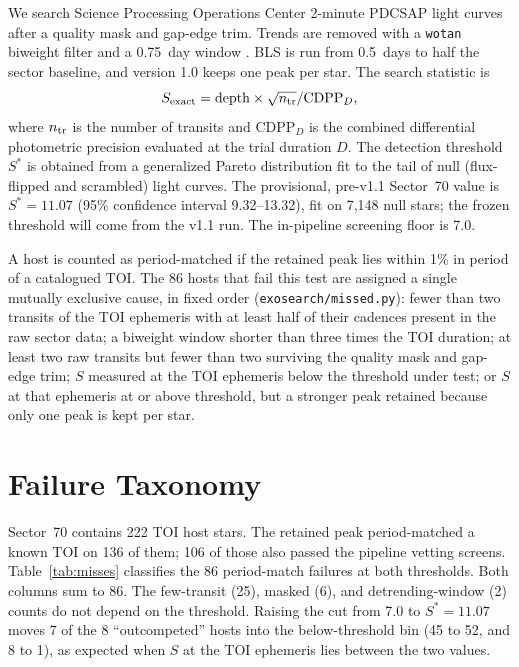 \documentclass[RNAAS]{aastex631}
\begin{document}
We search Science Processing Operations Center 2-minute PDCSAP light curves after a quality mask and gap-edge trim. Trends are removed with a \texttt{wotan} biweight filter and a 0.75~day window \citep{hippke19}. BLS is run from 0.5~days to half the sector baseline, and version 1.0 keeps one peak per star. The search statistic is
\begin{equation}
S_{\rm exact}=\mathrm{depth}\times\sqrt{n_{\rm tr}}/\mathrm{CDPP}_{D},
\end{equation}
where $n_{\rm tr}$ is the number of transits and $\mathrm{CDPP}_{D}$ is the combined differential photometric precision evaluated at the trial duration $D$. The detection threshold $S^{*}$ is obtained from a generalized Pareto distribution fit to the tail of null (flux-flipped and scrambled) light curves. The provisional, pre-v1.1 Sector~70 value is $S^{*}=11.07$ (95\% confidence interval 9.32--13.32), fit on 7,148 null stars; the frozen threshold will come from the v1.1 run. The in-pipeline screening floor is 7.0.

A host is counted as period-matched if the retained peak lies within 1\% in period of a catalogued TOI. The 86 hosts that fail this test are assigned a single mutually exclusive cause, in fixed order (\texttt{exosearch/missed.py}): fewer than two transits of the TOI ephemeris with at least half of their cadences present in the raw sector data; a biweight window shorter than three times the TOI duration; at least two raw transits but fewer than two surviving the quality mask and gap-edge trim; $S$ measured at the TOI ephemeris below the threshold under test; or $S$ at that ephemeris at or above threshold, but a stronger peak retained because only one peak is kept per star.

\section{Failure Taxonomy}

Sector~70 contains 222 TOI host stars. The retained peak period-matched a known TOI on 136 of them; 106 of those also passed the pipeline vetting screens. Table~\ref{tab:misses} classifies the 86 period-match failures at both thresholds. Both columns sum to 86. The few-transit (25), masked (6), and detrending-window (2) counts do not depend on the threshold. Raising the cut from 7.0 to $S^{*}=11.07$ moves 7 of the 8 ``outcompeted'' hosts into the below-threshold bin (45 to 52, and 8 to 1), as expected when $S$ at the TOI ephemeris lies between the two values.
\end{document}
